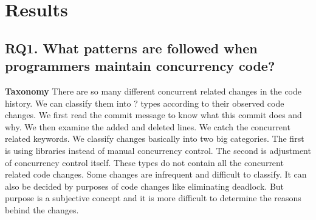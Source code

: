 \section{Results}
\label{sec:result}
\subsection{RQ1. What patterns are followed when programmers maintain concurrency code?}
\label{sec:result:pattern}
\textbf{Taxonomy} There are so many different concurrent related changes in the code history. We can classify them into ? types according to their observed code changes. We first read the commit message to know what this commit does and why. We then examine the added and deleted lines. We catch the concurrent related keywords. We classify changes basically into two big categories. The first is using libraries instead of manual concurrency control. The second is adjustment of concurrency control itself. These types do not contain all the concurrent related code changes. Some changes are infrequent and difficult to classify. It can also be decided by purposes of code changes like eliminating deadlock. But purpose is a subjective concept and it is more difficult to determine the reasons behind the changes.


